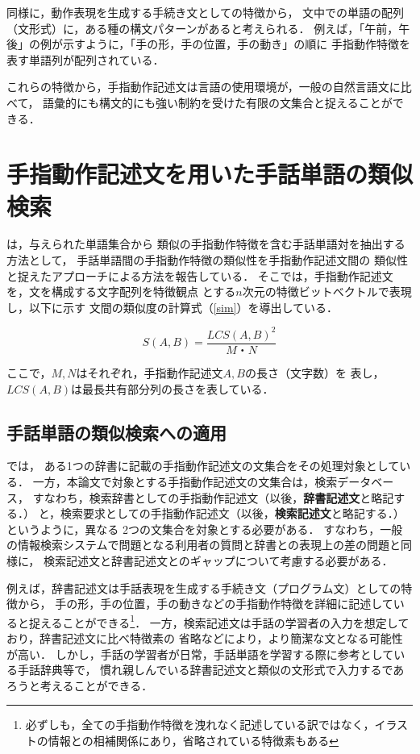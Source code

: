 同様に，動作表現を生成する手続き文としての特徴から，
文中での単語の配列（文形式）に，ある種の構文パターンがあると考えられる．
例えば，「午前，午後」の例が示すように，「手の形，手の位置，手の動き」の順に
手指動作特徴を表す単語列が配列されている．

これらの特徴から，手指動作記述文は言語の使用環境が，一般の自然言語文に比べて，
語彙的にも構文的にも強い制約を受けた有限の文集合と捉えることができる．


\section {手指動作記述文を用いた手話単語の類似検索}\label{Sign}


\cite{AdachiHisahiro2000}は，与えられた単語集合から
類似の手指動作特徴を含む手話単語対を抽出する方法として，
手話単語間の手指動作特徴の類似性を手指動作記述文間の
類似性と捉えたアプローチによる方法を報告している．
そこでは，手指動作記述文を，文を構成する文字配列を特徴観点
とする$n$次元の特徴ビットベクトルで表現し，以下に示す
文間の類似度の計算式（\ref{sim}）を導出している．

\begin{equation}
\label{sim}
S(A,B) = \frac{LCS(A,B)^2}{M・N}
\end{equation}


\noindent ここで，$M,N$はそれぞれ，手指動作記述文$A,B$の長さ（文字数）を
表し，$LCS(A,B)$は最長共有部分列の長さ\cite{Thomas1990}を表している．


\subsection {手話単語の類似検索への適用}

\cite{AdachiHisahiro2000}では，
ある1つの辞書に記載の手指動作記述文の文集合をその処理対象としている．
一方，本論文で対象とする手指動作記述文の文集合は，検索データベース，
すなわち，検索辞書としての手指動作記述文（以後，{\bf 辞書記述文}と略記する．）
と，検索要求としての手指動作記述文（以後，{\bf 検索記述文}と略記する．）
というように，異なる 2つの文集合を対象とする必要がある．
すなわち，一般の情報検索システムで問題となる利用者の質問と辞書との表現上の差\cite{Nagao1983}の問題と同様に，
検索記述文と辞書記述文とのギャップについて考慮する必要がある．

例えば，辞書記述文は手話表現を生成する手続き文（プログラム文）としての特徴から，
手の形，手の位置，手の動きなどの手指動作特徴を詳細に記述していると捉えることができる\footnote{必ずしも，全ての手指動作特徴を洩れなく記述している訳ではなく，イラストの情報との相補関係にあり，省略されている特徴素もある}．
一方，検索記述文は手話の学習者の入力を想定しており，辞書記述文に比べ特徴素の
省略などにより，より簡潔な文となる可能性が高い．
しかし，手話の学習者が日常，手話単語を学習する際に参考としている手話辞典等で，
慣れ親しんでいる辞書記述文と類似の文形式で入力するであろうと考えることができる．

